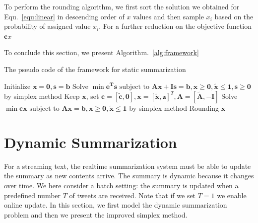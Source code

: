 \documentclass{llncs}
\begin{document}
To perform the rounding algorithm, we first sort the solution we obtained for Equ.~\ref{equ:linear} in descending order of $x$ values and then sample $x_i$ based on the probability of assigned value $x_i$.  For a further reduction on the objective function $\mathbf{c}{x}$

To conclude this section, we present Algorithm.~\ref{alg:framework}

\begin{algorithm}\label{alg:framework}
\caption{The pseudo code of the framework for static summarization}

Initialize $\mathbf{x}=\mathbf{0},\mathbf{s}=\mathbf{b}$\;
Solve $\min \mathbf{e^{T}s} \textrm{ subject to } \mathbf{Ax} + \mathbf{Is} = \mathbf{b}, \mathbf{x}\geq \mathbf{0},\tilde{\mathbf{x}} \leq \mathbf{1},\mathbf{s}\geq \mathbf{0}$ by simplex method\;
Keep $\mathbf{x}$, set $\mathbf{c}=[\tilde{\mathbf{c}},\mathbf{0}],\mathbf{x}=[\tilde{\mathbf{x}},\mathbf{z}]^T,\mathbf{A}=[\tilde{\mathbf{A}},-\mathbf{I}]$ \;
Solve $\min \mathbf{cx} \textrm{ subject to } \mathbf{Ax} = \mathbf{b}, \mathbf{x}\geq \mathbf{0},\tilde{\mathbf{x}} \leq \mathbf{1}$ by simplex method\;
Rounding $\mathbf{x}$\;
\end{algorithm}



\section{Dynamic Summarization}\label{sec:dynamic}
For a streaming text, the realtime summarization system must be able to update the summary as new contents arrive. The summary is dynamic because it changes over time. We here consider a batch setting: the summary is updated when a predefined number $T$ of tweets are received. Note that if we set $T=1$ we enable online update.  In this section, we first model the dynamic summarization problem and then we present the improved simplex method.
\end{document}
